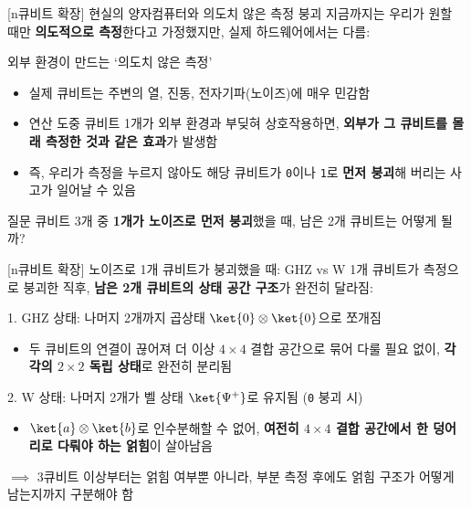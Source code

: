 \documentclass[aspectratio=169, 10pt]{beamer}
\begin{document}
\begin{frame}{[n큐비트 확장] 현실의 양자컴퓨터와 의도치 않은 측정 붕괴}
    지금까지는 우리가 원할 때만 \textbf{의도적으로 측정}한다고 가정했지만, 실제 하드웨어에서는 다름:
    \pause
    \vspace{0.15cm}
    \begin{qcblock}{외부 환경이 만드는 `의도치 않은 측정'}
        \begin{itemize}
            \item 실제 큐비트는 주변의 열, 진동, 전자기파(노이즈)에 매우 민감함
            \pause
            \item 연산 도중 큐비트 1개가 외부 환경과 부딪혀 상호작용하면, \textbf{외부가 그 큐비트를 몰래 측정한 것과 같은 효과}가 발생함
            \pause
            \item 즉, 우리가 측정을 누르지 않아도 해당 큐비트가 \texttt{0}이나 \texttt{1}로 \textbf{먼저 붕괴}해 버리는 사고가 일어날 수 있음
        \end{itemize}
    \end{qcblock}
    \pause
    \vspace{0.15cm}
    \begin{qctip}{질문}
        큐비트 3개 중 \textbf{1개가 노이즈로 먼저 붕괴}했을 때, 남은 2개 큐비트는 어떻게 될까?
    \end{qctip}
\end{frame}

\begin{frame}{[n큐비트 확장] 노이즈로 1개 큐비트가 붕괴했을 때: GHZ vs W}
    1개 큐비트가 측정으로 붕괴한 직후, \textbf{남은 2개 큐비트의 상태 공간 구조}가 완전히 달라짐:
    \pause
    \vspace{0.1cm}
    \begin{qcblock}{1. GHZ 상태: 나머지 2개까지 곱상태 $\ket{0}\otimes\ket{0}$으로 쪼개짐}
        \begin{itemize}
            \item 두 큐비트의 연결이 끊어져 더 이상 $4\times 4$ 결합 공간으로 묶어 다룰 필요 없이, \textbf{각각의 $2\times 2$ 독립 상태}로 완전히 분리됨
        \end{itemize}
    \end{qcblock}
    \pause
    \vspace{0.1cm}
    \begin{qctip}{2. W 상태: 나머지 2개가 벨 상태 $\ket{\Psi^+}$로 유지됨 (\texttt{0} 붕괴 시)}
        \begin{itemize}
            \item $\ket{a}\otimes\ket{b}$로 인수분해할 수 없어, \textbf{여전히 $4\times 4$ 결합 공간에서 한 덩어리로 다뤄야 하는 얽힘}이 살아남음
        \end{itemize}
    \end{qctip}
    \pause
    \vspace{0.1cm}
    $\implies$ 3큐비트 이상부터는 얽힘 여부뿐 아니라, 부분 측정 후에도 얽힘 구조가 어떻게 남는지까지 구분해야 함
\end{frame}
\end{document}

